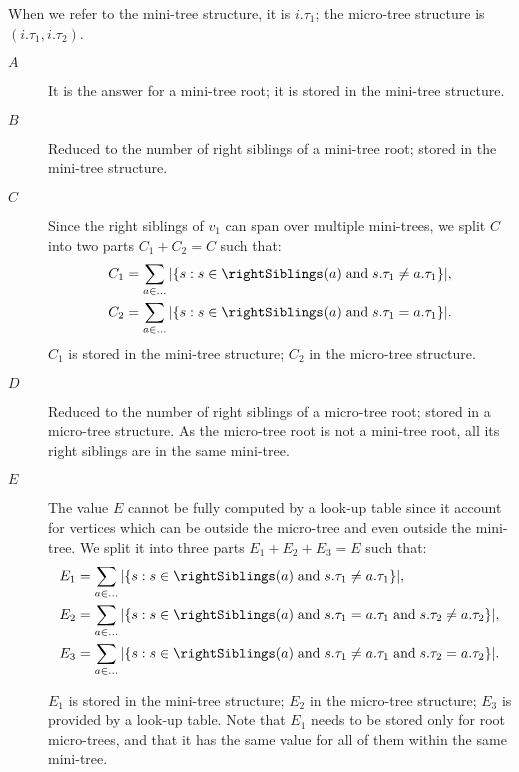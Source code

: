 When we refer to the mini-tree structure, it is $i.\tau_1$; the micro-tree structure is $(i.\tau_1, i.\tau_2)$.
\begin{description}
	\item[$A$]
	It is the answer for a mini-tree root; it is stored in the mini-tree structure.
	
	\item[$B$]
	Reduced to the number of right siblings of a mini-tree root; stored in the mini-tree structure.
	
	\item[$C$]
	Since the right siblings of $v_1$ can span over multiple mini-trees, we split $C$ into two parts $C_1 + C_2 = C$ such that:
	\begin{align*}
		C_1 &= \sum_{a \in \ldots} |\{ s : s \in \rightSiblings(a) \booland s.\tau_1 \ne a.\tau_1 \}|, \\
		C_2 &= \sum_{a \in \ldots} |\{ s : s \in \rightSiblings(a) \booland s.\tau_1 = a.\tau_1 \}|.
	\end{align*}
	$C_1$ is stored in the mini-tree structure; $C_2$ in the micro-tree structure.
	
	\item[$D$]
	Reduced to the number of right siblings of a micro-tree root; stored in a micro-tree structure.
	As the micro-tree root is not a mini-tree root, all its right siblings are in the same mini-tree.
	
	\item[$E$]
	The value $E$ cannot be fully computed by a look-up table since it account for vertices which can be outside the micro-tree and even outside the mini-tree.
	We split it into three parts $E_1 + E_2 + E_3 = E$ such that:
	\begin{align*}
		E_1 &= \sum_{a \in \ldots} |\{ s : s \in \rightSiblings(a) \booland s.\tau_1 \ne a.\tau_1 \}|, \\
		E_2 &= \sum_{a \in \ldots} |\{ s : s \in \rightSiblings(a) \booland s.\tau_1 = a.\tau_1 \booland s.\tau_2 \ne a.\tau_2 \}|, \\
		E_3 &= \sum_{a \in \ldots} |\{ s : s \in \rightSiblings(a) \booland s.\tau_1 \ne a.\tau_1 \booland s.\tau_2 = a.\tau_2  \}|.
	\end{align*}
	
	$E_1$ is stored in the mini-tree structure; $E_2$ in the micro-tree structure; $E_3$ is provided by a look-up table.
	Note that $E_1$ needs to be stored only for root micro-trees, and that it has the same value for all of them within the same mini-tree.
\end{description}

